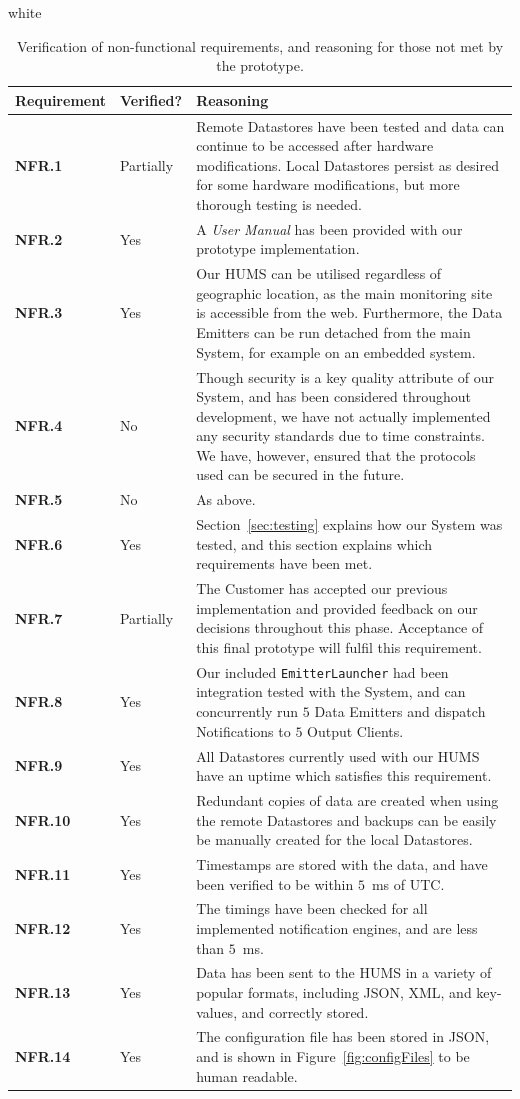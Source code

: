 \documentclass[10pt,a4paper]{article}
\newcommand{\tableformat}[4]{
\begin{table}[ht!]
\centering
  \rowcolors{2}{gray!10} {white}
\def\arraystretch{1.5}
\begin{tabularx}{\textwidth}{#1}
  \hline
  \rowcolor[gray]{0.9} #2
  \hline
\end{tabularx}
\caption{#3}
\label{#4}
\end{table}}
\newcommand{\nfr}[1]{\textcolor{reqColor}{\textbf{NFR.#1}}}
\begin{document}
\tableformat{ p{2cm}  p{2cm} X }{
Requirement & Verified? & Reasoning \\ \hline
\nfr{1} & Partially & Remote Datastores have been tested and data can continue to be accessed after hardware modifications. Local Datastores persist as desired for some hardware modifications, but more thorough testing is needed.\\
\nfr{2} & Yes & A \emph{User Manual} has been provided with our prototype implementation. \\
\nfr{3} & Yes & Our HUMS can be utilised regardless of geographic location, as the main monitoring site is accessible from the web. Furthermore, the Data Emitters can be run detached from the main System, for example on an embedded system. \\
\nfr{4} & No & Though security is a key quality attribute of our System, and has been considered throughout development, we have not actually implemented any security standards due to time constraints. We have, however, ensured that the protocols used can be secured in the future.\\
\nfr{5} & No & As above.\\
\nfr{6} & Yes & Section~\ref{sec:testing} explains how our System was tested, and this section explains which requirements have been met.\\
\nfr{7} & Partially & The Customer has accepted our previous implementation and provided feedback on our decisions throughout this phase. Acceptance of this final prototype will fulfil this requirement.\\
\nfr{8} & Yes & Our included \texttt{EmitterLauncher} had been integration tested with the System, and can concurrently run $5$ Data Emitters and dispatch Notifications to $5$ Output Clients.\\
\nfr{9} & Yes & All Datastores currently used with our HUMS have an uptime which satisfies this requirement.\\
\nfr{10} & Yes & Redundant copies of data are created when using the remote Datastores and backups can be easily be manually created for the local Datastores. \\
\nfr{11} & Yes & Timestamps are stored with the data, and have been verified to be within $5$~ms of UTC. \\
\nfr{12} & Yes & The timings have been checked for all implemented notification engines, and are less than $5$~ms. \\
\nfr{13} & Yes & Data has been sent to the HUMS in a variety of popular formats, including JSON, XML, and key-values, and correctly stored.\\
\nfr{14} & Yes & The configuration file has been stored in JSON, and is shown in Figure~\ref{fig:configFiles} to be human readable.\\
}{Verification of non-functional requirements, and reasoning for those not met by the prototype.}{tab:nonfunctionalEval}
\end{document}
